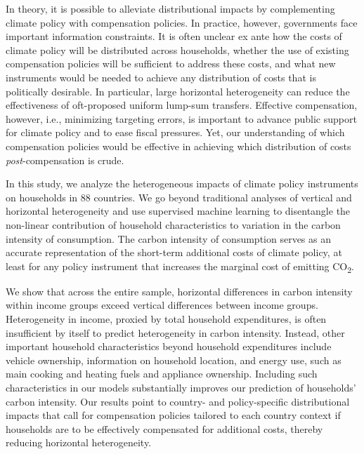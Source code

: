 \documentclass[12pt, a4paper]{article}
\begin{document}
In theory, it is possible to alleviate distributional impacts by complementing climate policy with compensation policies. In practice, however, governments face important information constraints. It is often unclear ex ante how the costs of climate policy will be distributed across households, whether the use of existing compensation policies will be sufficient to address these costs, and what new instruments would be needed to achieve any distribution of costs that is politically desirable. In particular, large horizontal heterogeneity can reduce the effectiveness of oft-proposed uniform lump-sum transfers. Effective compensation, however, i.e., minimizing targeting errors, is important to advance public support for climate policy and to ease fiscal pressures. Yet, our understanding of which compensation policies would be effective in achieving which distribution of costs \textit{post}-compensation is crude.

In this study, we analyze the heterogeneous impacts of climate policy instruments on households in 88 countries. We go beyond traditional analyses of vertical and horizontal heterogeneity and use supervised machine learning to disentangle the non-linear contribution of household characteristics to variation in the carbon intensity of consumption. The carbon intensity of consumption serves as an accurate representation of the short-term additional costs of climate policy, at least for any policy instrument that increases the marginal cost of emitting CO\textsubscript{2}.

We show that across the entire sample, horizontal differences in carbon intensity within income groups exceed vertical differences between income groups. Heterogeneity in income, proxied by total household expenditures, is often insufficient by itself to predict heterogeneity in carbon intensity. Instead, other important household characteristics beyond household expenditures include vehicle ownership, information on household location, and energy use, such as main cooking and heating fuels and appliance ownership. Including such characteristics in our models substantially improves our prediction of households' carbon intensity. Our results point to country- and policy-specific distributional impacts that call for compensation policies tailored to each country context if households are to be effectively compensated for additional costs, thereby reducing horizontal heterogeneity. 
\end{document}
